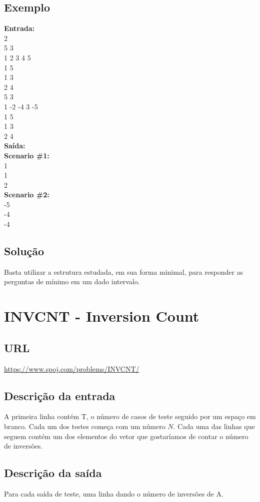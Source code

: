 \subsection{Exemplo}
\textbf{Entrada:} \\
2 \\ 
5 3 \\
1 2 3 4 5\\
1 5\\
1 3\\
2 4\\
5 3\\
1 -2 -4 3 -5\\
1 5\\
1 3\\
2 4\\

\textbf{Saída:} \\
\textbf{Scenario \#1:} \\
1\\
1\\
2\\
\textbf{Scenario \#2:} \\
-5\\
-4\\
-4\\
\subsection{Solução}
Basta utilizar a estrutura estudada, em sua forma minimal, para responder as perguntas de mínimo em um dado intervalo.


\section{INVCNT - Inversion Count}
\subsection{URL}
\url{https://www.spoj.com/problems/INVCNT/}
\subsection{Descrição da entrada}
A primeira linha contém T, o número de casos de teste seguido por um espaço em branco. Cada um dos testes começa com um número $N$. Cada uma das linhas que seguem contém um dos elementos do vetor que gostaríamos de contar o número de inversões.
\subsection{Descrição da saída}
Para cada saída de teste, uma linha dando o número de inversões de A.

